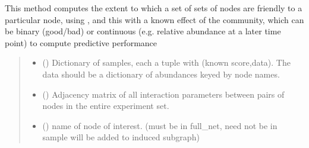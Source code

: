 \documentclass[letterpaper,10pt,english]{sphinxmanual}
\begin{document}
\begin{fulllineitems}
\label{\detokenize{scoring:score_net.score_net}}
\pysigstartsignatures
{}
\pysigstopsignatures
\sphinxAtStartPar
This method computes the extent to which a set of sets of nodes are friendly to a particular node, using ,
and  this with a known effect of the community, which can be binary (good/bad) or continuous (e.g. relative abundance at a later time point) to compute predictive performance
\begin{quote}\begin{description}
\begin{itemize}
\item {} 
\sphinxAtStartPar
{} (\sphinxstyleliteralemphasis{\sphinxupquote{{[}}}\sphinxstyleliteralemphasis{\sphinxupquote{{[}}}\sphinxstyleliteralemphasis{\sphinxupquote{,}}\sphinxstyleliteralemphasis{\sphinxupquote{{]}}}\sphinxstyleliteralemphasis{\sphinxupquote{{]}}}) \textendash{} Dictionary of samples, each a tuple with (known score,data). The data should be a dictionary of abundances keyed by node names.

\item {} 
\sphinxAtStartPar
{} () \textendash{} Adjacency matrix of all interaction parameters between pairs of nodes in the entire experiment set.

\item {} 
\sphinxAtStartPar
{} () \textendash{} name of node of interest. (must be in full\_net, need not be in sample \sphinxhyphen{} will be added to induced subgraph)


\end{itemize}
\end{description}
\end{quote}
\end{fulllineitems}
\end{document}
